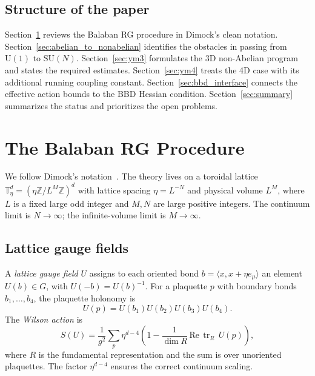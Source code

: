 \documentclass[11pt,a4paper]{article}
\theoremstyle{plain}
\theoremstyle{definition}
\theoremstyle{remark}
\newcommand{\Z}{\mathbb{Z}}
\newcommand{\T}{\mathbb{T}}
\newcommand{\tr}{\operatorname{tr}}
\newcommand{\SU}{\mathrm{SU}}
\newcommand{\U}{\mathrm{U}}
\begin{document}
\subsection{Structure of the paper}

Section~\ref{sec:balaban_rg} reviews the Balaban RG procedure
in Dimock's clean notation.
Section~\ref{sec:abelian_to_nonabelian} identifies the
obstacles in passing from $\U(1)$ to $\SU(N)$.
Section~\ref{sec:ym3} formulates the 3D non-Abelian program
and states the required estimates.
Section~\ref{sec:ym4} treats the 4D case with its
additional running coupling constant.
Section~\ref{sec:bbd_interface} connects the effective
action bounds to the BBD Hessian condition.
Section~\ref{sec:summary} summarizes the status
and prioritizes the open problems.

\section{The Balaban RG Procedure}\label{sec:balaban_rg}

We follow Dimock's notation~\cite{Dimock13a,Dimock22}.
The theory lives on a toroidal lattice
$\T_\eta^d = (\eta \Z / L^M \Z)^d$ with lattice spacing
$\eta = L^{-N}$ and physical volume $L^M$, where $L$ is a
fixed large odd integer and $M, N$ are large positive integers.
The continuum limit is $N \to \infty$; the
infinite-volume limit is $M \to \infty$.

\subsection{Lattice gauge fields}

A \emph{lattice gauge field} $U$ assigns to each oriented
bond $b = \langle x, x + \eta e_\mu \rangle$ an element
$U(b) \in G$, with $U(-b) = U(b)^{-1}$.
For a plaquette $p$ with boundary bonds $b_1, \ldots, b_4$,
the plaquette holonomy is
\begin{equation}
  U(p) = U(b_1) U(b_2) U(b_3) U(b_4).
\end{equation}
The \emph{Wilson action} is
\begin{equation}\label{eq:wilson_action}
  S(U) = \frac{1}{g^2} \sum_p \eta^{d-4}
  \left(1 - \frac{1}{\dim R}\,\text{Re}\,\tr_R\, U(p)\right),
\end{equation}
where $R$ is the fundamental representation and the sum is
over unoriented plaquettes. The factor $\eta^{d-4}$ ensures
the correct continuum scaling.
\end{document}

